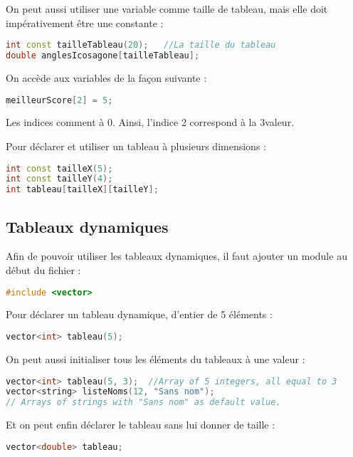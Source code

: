 \documentclass[a4paper,twoside]{article}
\begin{document}
On peut aussi utiliser une variable comme taille de tableau, mais elle doit impérativement être une constante :
\begin{lstlisting}[language=C++]
int const tailleTableau(20);   //La taille du tableau
double anglesIcosagone[tailleTableau];
\end{lstlisting}

\bigskip

On accède aux variables de la façon suivante :
\begin{lstlisting}[language=C++]
meilleurScore[2] = 5;
\end{lstlisting}

\begin{attention}
Les indices comment à 0. Ainsi, l'indice 2 correspond à la 3\ieme valeur.
\end{attention}

Pour déclarer et utiliser un tableau à plusieurs dimensions :
\begin{lstlisting}[language=C++]
int const tailleX(5);
int const tailleY(4);
int tableau[tailleX][tailleY];
\end{lstlisting}

\subsection{Tableaux dynamiques}
Afin de pouvoir utiliser les tableaux dynamiques, il faut ajouter un module au début du fichier :
\begin{lstlisting}[language=C++]
#include <vector>
\end{lstlisting}

Pour déclarer un tableau dynamique, d'entier de 5 éléments :
\begin{lstlisting}[language=C++]
vector<int> tableau(5);
\end{lstlisting}

On peut aussi initialiser tous les éléments du tableaux à une valeur :
\begin{lstlisting}[language=C++]
vector<int> tableau(5, 3);  //Array of 5 integers, all equal to 3
vector<string> listeNoms(12, "Sans nom");
// Arrays of strings with "Sans nom" as default value.
\end{lstlisting}

\bigskip

Et on peut enfin déclarer le tableau sans lui donner de taille :
\begin{lstlisting}[language=C++]
vector<double> tableau;
\end{lstlisting}
\end{document}
